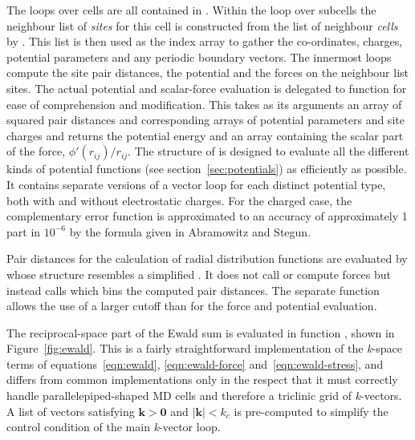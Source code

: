 \documentclass[a4paper,twoside]{report}
\providecommand{\bm}[1]{\mathbf{#1}}
\begin{document}
The loops over cells are all contained in .
Within the loop over subcells the neighbour list of \emph{sites} for
this cell is constructed from the list of neighbour \emph{cells} by
.  This list is then used as the index
array to gather the co-ordinates, charges, potential parameters and
any periodic boundary vectors.  The innermost loops compute the site
pair distances, the potential and the forces on the neighbour list
sites.  The actual potential and scalar-force evaluation is delegated
to function  for ease of comprehension and modification.
This takes as its arguments an array of squared pair distances and
corresponding arrays of potential parameters and site charges and
returns the potential energy and an array containing the scalar part
of the force, $\phi'(r_{ij})/r_{ij}$. The structure of 
is designed to evaluate all the different kinds of potential functions
(see section~\ref{sec:potentials}) as efficiently as possible.  It
contains separate versions of a vector loop for each distinct
potential type, both with and without electrostatic charges.  For the
charged case, the complementary error function is approximated to an
accuracy of approximately 1 part in $10^{-6}$ by the formula given in
Abramowitz and Stegun\cite[section 7.1.26]{abramowitz:70}.

Pair distances for the calculation of radial distribution functions
are evaluated by  whose structure
resembles a simplified . It does not call
 or compute forces but instead calls
 which bins the computed pair distances. The
separate function allows the use of a larger cutoff than for the force
and potential evaluation.

The reciprocal-space part of the Ewald sum is evaluated in function
, shown in Figure~\ref{fig:ewald}.  This is a fairly
straightforward implementation of the \emph{k}-space terms of
equations~\ref{eqn:ewald}, \ref{eqn:ewald-force}
and~\ref{eqn:ewald-stress}, and differs from common implementations
only in the respect that it must correctly handle
parallelepiped-shaped MD cells and therefore a triclinic grid of
\emph{k}-vectors.  A list of vectors satisfying $\bm{k} > \bm{0}$ and
$|\bm{k}| < k_c$ is pre-computed to simplify the control condition of
the main \emph{k}-vector loop.
\end{document}
